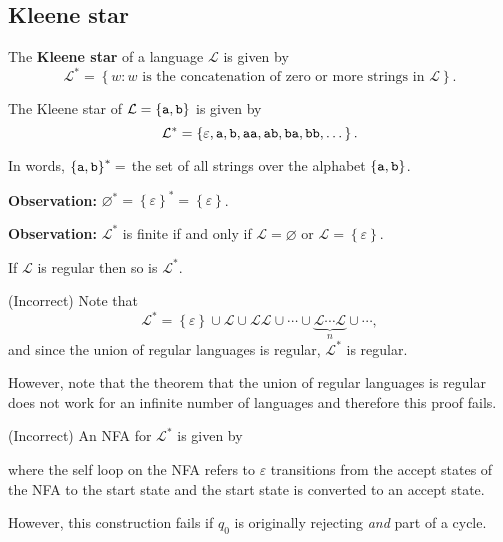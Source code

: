 \documentclass{notes}
\begin{document}
\subsection{Kleene star}

\begin{defn}
  The {\boldmath \bfseries Kleene star} of a language $\mathcal L$ is given by 
  \[
    \mathcal L^* = \left \{ w : \text{$w$ is the concatenation of zero or more strings in $\mathcal L$} \right \}.
  \]
\end{defn}

\begin{eg}
  The Kleene star of $\mathcal L = \left \{ \verb~a~, \verb~b~ \right \}$ is given by 
  \[
    \mathcal L^* = \left \{ \varepsilon, \verb~a~, \verb~b~, \verb~aa~, \verb~ab~, \verb~ba~, \verb~bb~, \dots \right \}.
  \]
  
  In words, $\left \{ \verb~a~, \verb~b~ \right \}^* = $ the set of all strings over the alphabet $\left \{ \verb~a~, \verb~b~ \right \}$.
\end{eg}

{\boldmath \bfseries Observation: } $\varnothing^* = \left \{ \varepsilon \right \}^* = \left \{ \varepsilon \right \}$.

{\boldmath \bfseries Observation: } $\mathcal L^*$ is finite if and only if $\mathcal L = \varnothing$ or $\mathcal L = \left \{ \varepsilon \right \}$.

\begin{thm}
  If $\mathcal L$ is regular then so is $\mathcal L^*$.
\end{thm}

\begin{prf}
  {\color{red} (Incorrect)} Note that 
  \[
    \mathcal L^* = \left \{ \varepsilon \right \} \cup \mathcal L \cup \mathcal L \mathcal L \cup \cdots \cup \underbrace{\mathcal L \cdots \mathcal L}_{n} \cup \cdots, 
  \]
  and since the union of regular languages is regular, $\mathcal L^*$ is regular.
  
  However, note that the theorem that the union of regular languages is regular does not work for an infinite number of languages and therefore this proof fails.
\end{prf}

\begin{prf}
  {\color{red} (Incorrect)} An NFA for $\mathcal L^*$ is given by 

  \begin{center}
  \end{center}
  where the self loop on the NFA refers to $\varepsilon$ transitions from the accept states of the NFA to the start state and the start state is converted to an accept state.
  
  However, this construction fails if $q_0$ is originally rejecting \textit{and} part of a cycle.
\end{prf}
\end{document}
